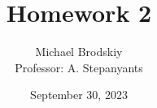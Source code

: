 


\title{Homework 2}
\date{September 30, 2023}
\author{Michael Brodskiy\\ \small Professor: A. Stepanyants}



\maketitle

